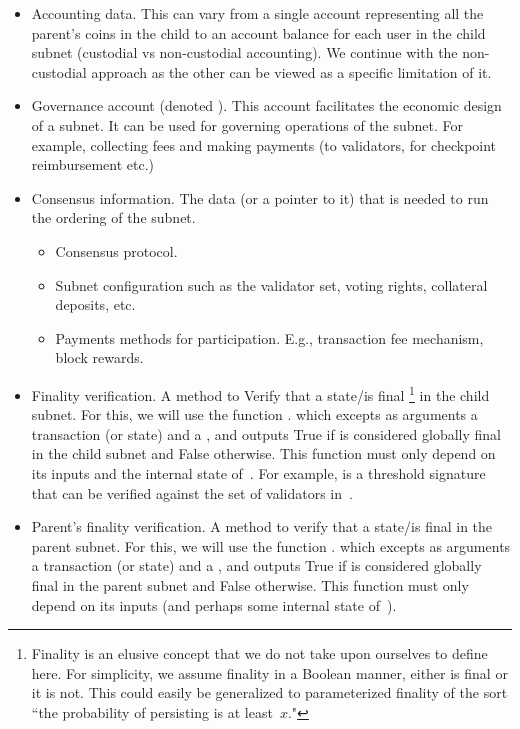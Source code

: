 \begin{itemize}
    \item Accounting data. This can vary from a single account representing all the parent's coins in the child to an account balance for each user in the child subnet (custodial vs non-custodial accounting). We continue with the non-custodial approach as the other can be viewed as a specific limitation of it.
    \item Governance account (denoted \gov). This account facilitates the economic design of a subnet. It can be used for governing operations of the subnet. For example, collecting fees and making payments (to validators, for checkpoint reimbursement etc.) 
    \item Consensus information. The data (or a pointer to it) that is needed to run the ordering of the subnet.
    \begin{itemize}
        \item Consensus protocol.
        \item Subnet configuration such as the validator set, voting rights, collateral deposits, etc.
        \item Payments methods for participation. E.g., transaction fee mechanism, block rewards.
    \end{itemize}
    \item Finality verification. A method to Verify that a state/\tx is final%
    \footnote{Finality is an elusive concept that we do not take upon ourselves to define here. For simplicity, we assume finality in a Boolean manner, either \tx is final or it is not. This could easily be generalized to parameterized finality of the sort ``the probability of \tx persisting is at least~$x$."}
    in the child subnet. For this, we will use the function \sa.\verifyGfinal{\tx}{\prf} which excepts as arguments a transaction (or state) and a \prf, and outputs True if \tx is considered globally final in the child subnet and False otherwise. This function must only depend on its inputs and the internal state of~\sa. For example, \prf is a threshold signature that can be verified against the set of validators in~\sa.
  \item Parent's finality verification. A method to verify that a state/\tx is final in the parent subnet. For this, we will use the function \gw.\verifyPfinal{\tx}{\prf} which excepts as arguments a transaction (or state) and a \prf, and outputs True if \tx is considered globally final in the parent subnet and False otherwise. This function must only depend on its inputs (and perhaps some internal state of~\gw). 
\end{itemize}
